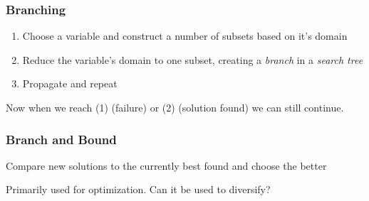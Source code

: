 \begin{frame}
	\frametitle{Branching}

	\begin{enumerate}
		\item Choose a variable and construct a number of subsets based on it's domain
		\item Reduce the variable's domain to one subset, creating a \textit{branch} in a \textit{search tree}
		\item Propagate and repeat
	\end{enumerate}

	\vspace{0.5cm}

	Now when we reach (1) (failure) or (2) (solution found) we can still continue.

\end{frame}

\begin{frame}
	\frametitle{Branch and Bound}

	Compare new solutions to the currently best found and choose the better \cite{BaB}

	\vspace{0.5cm}

	Primarily used for optimization. Can it be used to diversify?

\end{frame}
